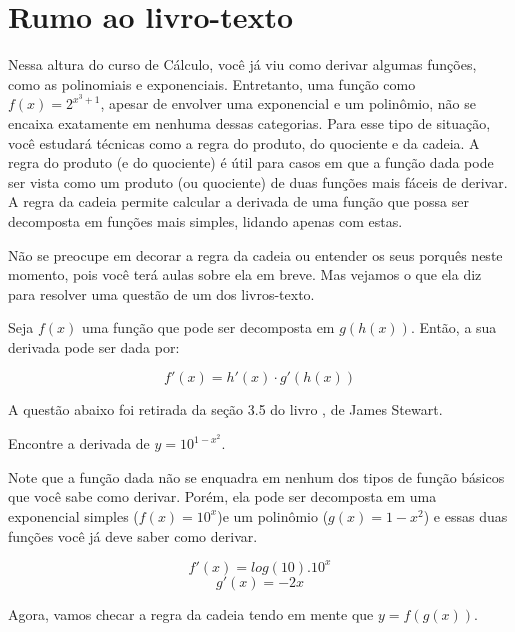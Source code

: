 \documentclass[main.tex]{subfiles}
\begin{document}
\section{Rumo ao livro-texto}


Nessa altura do curso de Cálculo, você já viu como derivar algumas funções, como as polinomiais e exponenciais.  Entretanto, uma função como $f(x)=2^{x^3+1}$, apesar de envolver uma exponencial e um polinômio, não se encaixa exatamente em nenhuma dessas categorias. Para esse tipo de situação, você estudará técnicas como a regra do produto, do quociente e da cadeia. A regra do produto (e do quociente) é útil para casos em que a função dada pode ser vista como um produto (ou quociente) de duas funções mais fáceis de derivar. A regra da cadeia permite calcular a derivada de uma função que possa ser decomposta em funções mais simples, lidando apenas com estas.

Não se preocupe em decorar a regra da cadeia ou entender os seus porquês neste momento, pois você terá aulas sobre ela em breve. Mas vejamos o que ela diz para resolver uma questão de um dos livros-texto.

\begin{shaded*}
Seja $f(x)$ uma função que pode ser decomposta em $g(h(x))$. Então, a sua derivada pode ser dada por:

$$f'(x) = h'(x) \cdot g'(h(x)) $$
\end{shaded*}

A questão abaixo foi retirada da seção 3.5 do livro , de James Stewart.

\begin{resolvida}
Encontre a derivada de $y=10^{1-x^2}$.
\end{resolvida}

Note que a função dada não se enquadra em nenhum dos tipos de função básicos que você sabe como derivar. Porém, ela pode ser decomposta em uma exponencial simples ($f(x)=10^x$)e um polinômio ($g(x)=1-x^2$) e essas duas funções você já deve saber como derivar.

$$f'(x)=log(10) . 10^x $$
$$g'(x)=-2x $$

Agora, vamos checar a regra da cadeia tendo em mente que $y=f(g(x))$.
\end{document}
